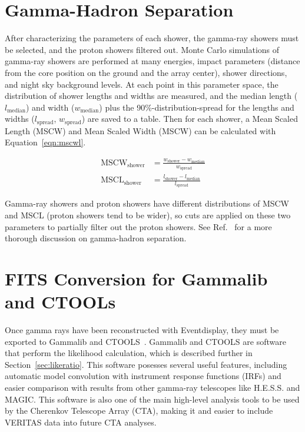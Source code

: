 \section{Gamma-Hadron Separation}
After characterizing the parameters of each shower, the gamma-ray showers must be selected, and the proton showers filtered out.
Monte Carlo simulations of gamma-ray showers are performed at many energies, impact parameters (distance from the core position on the ground and the array center), shower directions, and night sky background levels.
At each point in this parameter space, the distribution of shower lengths and widths are measured, and the median length ($l_{\textrm{median}}$) and width ($w_{\textrm{median}}$) plus the 90\%-distribution-spread for the lengths and widths ($l_{\textrm{spread}}$, $w_{\textrm{spread}}$) are saved to a table.
Then for each shower, a Mean Scaled Length (MSCW) and Mean Scaled Width (MSCW) can be calculated with Equation~\ref{eqn:mscwl}.

\begin{equation}\label{eqn:mscwl}
  \begin{split}
    \textrm{MSCW}_{\textrm{shower}} & = \frac{w_{\textrm{shower}}-w_{\textrm{median}}}{w_{\textrm{spread}}} \\
    \textrm{MSCL}_{\textrm{shower}} & = \frac{l_{\textrm{shower}}-l_{\textrm{median}}}{l_{\textrm{spread}}}
  \end{split}
\end{equation}

Gamma-ray showers and proton showers have different distributions of MSCW and MSCL (proton showers tend to be wider), so cuts are applied on these two parameters to partially filter out the proton showers.
See Ref.~\cite{Krause2017} for a more thorough discussion on gamma-hadron separation.

\section{FITS Conversion for Gammalib and CTOOLs}\label{fitsconversion}
Once gamma rays have been reconstructed with Eventdisplay, they must be exported to Gammalib and CTOOLS~\cite{gammalibctools}.
Gammalib and CTOOLS are software that perform the likelihood calculation, which is described further in Section~\ref{sec:likeratio}.
This software posesses several useful features, including automatic model convolution with instrument response functions (IRFs) and easier comparison with results from other gamma-ray telescopes like H.E.S.S. and MAGIC.
This software is also one of the main high-level analysis tools to be used by the Cherenkov Telescope Array (CTA), making it and easier to include VERITAS data into future CTA analyses.


